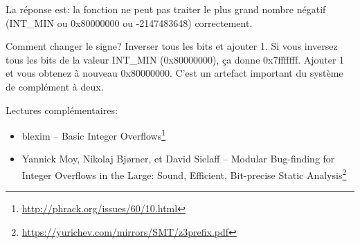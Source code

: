 La réponse est: la fonction ne peut pas traiter le plus grand nombre négatif (INT\_MIN
ou 0x80000000 ou -2147483648) correctement.

Comment changer le signe? Inverser tous les bits et ajouter 1.
Si vous inversez tous les bits de la valeur INT\_MIN (0x80000000), ça donne 0x7fffffff.
Ajouter 1 et vous obtenez à nouveau 0x80000000.
C'est un artefact important du système de complément à deux.

Lectures  complémentaires:

\begin{itemize}
\item blexim -- Basic Integer Overflows\footnote{\url{http://phrack.org/issues/60/10.html}}

\item Yannick Moy, Nikolaj Bjørner, et David Sielaff -- Modular Bug-finding for Integer Overflows in the Large: Sound, Efficient, Bit-precise Static Analysis\footnote{\url{https://yurichev.com/mirrors/SMT/z3prefix.pdf}}
\end{itemize}

